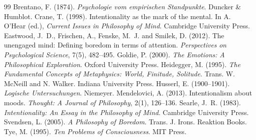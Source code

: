 \documentclass{situationist-preprint}
\begin{document}
\begin{thebibliography}{99}\small
{} Brentano, F. (1874). \emph{Psychologie vom empirischen Standpunkte}. Duncker \& Humblot.
 Crane, T. (1998). Intentionality as the mark of the mental. In A. O'Hear (ed.), \emph{Current Issues in Philosophy of Mind}. Cambridge University Press.
 Eastwood, J.~D., Frischen, A., Fenske, M.~J. and Smilek, D. (2012). The unengaged mind: Defining boredom in terms of attention. \emph{Perspectives on Psychological Science}, 7(5), 482--495.
 Goldie, P. (2000). \emph{The Emotions: A Philosophical Exploration}. Oxford University Press.
 Heidegger, M. (1995). \emph{The Fundamental Concepts of Metaphysics: World, Finitude, Solitude}. Trans. W. McNeill and N. Walker. Indiana University Press.
 Husserl, E. (1900--1901). \emph{Logische Untersuchungen}. Niemeyer.
 Mendelovici, A. (2013). Intentionalism about moods. \emph{Thought: A Journal of Philosophy}, 2(1), 126--136.
 Searle, J.~R. (1983). \emph{Intentionality: An Essay in the Philosophy of Mind}. Cambridge University Press.
 Svendsen, L. (2005). \emph{A Philosophy of Boredom}. Trans. J. Irons. Reaktion Books.
 Tye, M. (1995). \emph{Ten Problems of Consciousness}. MIT Press.
\end{thebibliography}
\end{document}
